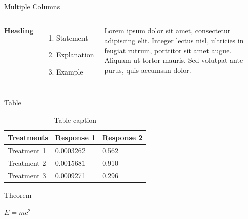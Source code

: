 \documentclass[aspectratio=169,xcolor=dvipsnames]{beamer}
\begin{document}
\begin{frame}{Multiple Columns}
    \begin{columns}[c] %

        \textbf{Heading}
        \begin{enumerate}
            \item Statement
            \item Explanation
            \item Example
        \end{enumerate}

        Lorem ipsum dolor sit amet, consectetur adipiscing elit. Integer lectus nisl, ultricies in feugiat rutrum, porttitor sit amet augue. Aliquam ut tortor mauris. Sed volutpat ante purus, quis accumsan dolor.

    \end{columns}
\end{frame}


\begin{frame}{Table}
    \begin{table}
        \begin{tabular}{l l l}
            \toprule
            \textbf{Treatments} & \textbf{Response 1} & \textbf{Response 2} \\
            \midrule
            Treatment 1         & 0.0003262           & 0.562               \\
            Treatment 2         & 0.0015681           & 0.910               \\
            Treatment 3         & 0.0009271           & 0.296               \\
            \bottomrule
        \end{tabular}
        \caption{Table caption}
    \end{table}
\end{frame}


\begin{frame}{Theorem}
    \begin{theorem}
        $E = mc^2$
    \end{theorem}
\end{frame}
\end{document}
